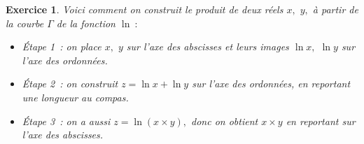 \documentclass[10pt]{article}
\newtheorem{exo}{Exercice}
\begin{document}
\begin{exo}

Voici comment on construit le produit de deux réels $x,$ $y,$ à partir de la courbe $\Gamma$ de la fonction $\ln~:$

\begin{itemize}
\item[\textbullet] Étape 1~: on place $x,$ $y$ sur l'axe des abscisses et leurs images $\ln x,$ $\ln y$ sur l'axe des ordonnées.
\item[\textbullet] Étape 2~: on construit $z=\ln x+\ln y$ sur l'axe des ordonnées, en reportant une longueur au compas.
\item[\textbullet] Étape 3~: on a aussi $z=\ln (x\times y),$ donc on obtient $x\times y$ en reportant sur l'axe des abscisses.
\end{itemize}




\end{exo}
\end{document}
